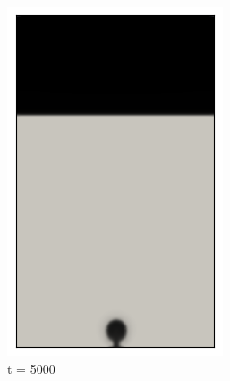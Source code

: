 \begin{figure}[H]
	\centering
	\begin{subfigure}{0.25\textwidth}
		\includegraphics[width=\linewidth]{figs/cap4/bb_760_s5}
		\caption{t = 5000}
		\label{fig:1}
	\end{subfigure}\hfil 
	\begin{subfigure}{0.25\textwidth}

\end{subfigure}
\end{figure}
